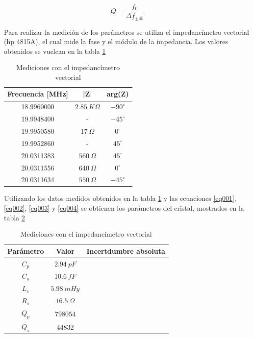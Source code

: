 \documentclass[a4paper,10pt]{article}
\begin{document}
		\begin{equation} \label{eq004}
			Q = \frac{f_0}{\Delta f_{\pm45}}
		\end{equation}
		
		\indent Para realizar la medición de los parámetros se utiliza el 
		impedancímetro vectorial (hp 4815A), el cual mide la fase y el módulo de
		la impedancia. Los valores obtenidos se vuelcan en la tabla \ref{tab003}
		\begin{table}[!htp]
			\centering
			\begin{tabular}{|c|c|c|}
				\hline
				Frecuencia [MHz] & |Z| & arg(Z) \\
				\hline
				18.9960000 & $2.85~K\Omega$ & $-90^{\circ}$ \\
				\hline
				19.9948400 & - & $-45^{\circ}$ \\ 
				\hline
				19.9950580 & $17~\Omega$ & $0^{\circ}$ \\
				\hline
				19.9952860 & - & $45^{\circ}$ \\ 
				\hline									
				20.0311383 & $560~\Omega$ & $45^{\circ}$ \\
				\hline									
				20.0311556 & $640~\Omega$ & $0^{\circ}$ \\
				\hline									
				20.0311634 & $550~\Omega$ & $-45^{\circ}$ \\
				\hline									
			\end{tabular}
			\caption{Mediciones con el impedancímetro vectorial} \label{tab003}
		\end{table}	
		
		\indent Utilizando los datos medidos obtenidos en la tabla \ref{tab003}
		y las ecuaciones \ref{eq001}, \ref{eq002}, \ref{eq003} y \ref{eq004} se
		obtienen los parámetros del cristal, mostrados en la tabla \ref{tab004}
		\begin{table}[!htp]
			\centering
			\begin{tabular}{|c|c|c|}
				\hline
				Parámetro & Valor & Incertdumbre absoluta \\
				\hline
				$C_p$ & $2.94~pF$ & \\
				\hline
				$C_s$ & $10.6~fF$ & \\ 
				\hline
				$L_s$ & $5.98~mHy$ & \\
				\hline
				$R_s$ & $16.5~\Omega$ & \\ 
				\hline									
				$Q_p$ & $798054$ & \\
			\hline
				$Q_s$ & $44832$  & \\
				\hline
			\end{tabular}
			\caption{Mediciones con el impedancímetro vectorial} \label{tab004}
		\end{table}	
\end{document}
